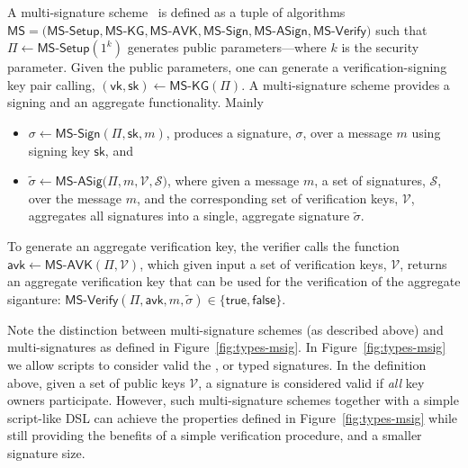 \sloppy
A multi-signature scheme~\cite{musigs} is defined as a tuple of algorithms 
$\textsf{MS} = (\textsf{MS-Setup}, \textsf{MS-KG}, \textsf{MS-AVK}, 
\allowbreak\textsf{MS-Sign}, \textsf{MS-ASign}, \textsf{MS-Verify)}$ such that 
$\Pi\leftarrow\textsf{MS-Setup}(1^k)$ generates public parameters---where $k$ is 
the security parameter. Given the public parameters, one can generate a 
verification-signing key pair calling, 
$(\mathsf{vk,sk})\leftarrow\textsf{MS-KG}(\Pi)$. A multi-signature scheme 
provides a signing and an aggregate functionality. Mainly
\begin{itemize}
\item $\sigma\leftarrow\textsf{MS-Sign}(\Pi, \mathsf{sk}, m)$, produces a 
signature, $\sigma$, over a message $m$ using signing key $\mathsf{sk}$, and
\item $\tilde{\sigma}\leftarrow\textsf{MS-ASig}(\Pi, m, \mathcal{V, S)}$, where 
given a message $m$, a set of signatures, $\mathcal{S}$, over the message $m$, 
and the corresponding set of verification keys, $\mathcal{V}$, aggregates all 
signatures into a single, aggregate signature $\tilde{\sigma}$. 
\end{itemize}

To generate an aggregate verification key, the verifier calls the function 
$\mathsf{avk}\leftarrow\textsf{MS-AVK}(\Pi, \mathcal{V})$, which given input a 
set of verification keys, $\mathcal{V}$, returns an aggregate verification key 
that can be used for the verification of the aggregate siganture: 
$\textsf{MS-Verify}(\Pi, \mathsf{avk}, m, 
\tilde{\sigma})\in\{\textsf{true},\textsf{false}\}$. 

Note the distinction between multi-signature schemes (as described above) and 
multi-signatures as defined in Figure~\ref{fig:types-msig}. In 
Figure~\ref{fig:types-msig} we allow scripts to consider valid the 
,  or  typed signatures. 
In the definition above, given a set of public keys $\mathcal{V}$, a signature 
is considered valid if \textit{all} key owners participate. However, such 
multi-signature schemes together with a simple script-like DSL can achieve the 
properties defined in Figure~\ref{fig:types-msig} while still providing the 
benefits of a simple verification procedure, and a smaller signature size. 
